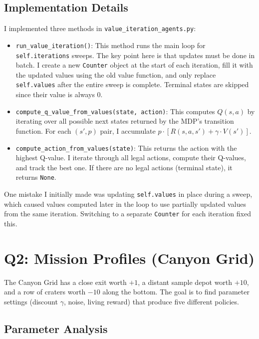 \documentclass[11pt,a4paper]{article}
\begin{document}
\subsection{Implementation Details}

I implemented three methods in \texttt{value\_iteration\_agents.py}:

\begin{itemize}[leftmargin=2em]
    \item \texttt{run\_value\_iteration()}: This method runs the main loop for \texttt{self.iterations} sweeps. The key point here is that updates must be done in batch. I create a new \texttt{Counter} object at the start of each iteration, fill it with the updated values using the old value function, and only replace \texttt{self.values} after the entire sweep is complete. Terminal states are skipped since their value is always 0.

    \item \texttt{compute\_q\_value\_from\_values(state, action)}: This computes $Q(s,a)$ by iterating over all possible next states returned by the MDP's transition function. For each $(s', p)$ pair, I accumulate $p \cdot [R(s,a,s') + \gamma \cdot V(s')]$.

    \item \texttt{compute\_action\_from\_values(state)}: This returns the action with the highest Q-value. I iterate through all legal actions, compute their Q-values, and track the best one. If there are no legal actions (terminal state), it returns \texttt{None}.
\end{itemize}

One mistake I initially made was updating \texttt{self.values} in place during a sweep, which caused values computed later in the loop to use partially updated values from the same iteration. Switching to a separate \texttt{Counter} for each iteration fixed this.

\section{Q2: Mission Profiles (Canyon Grid)}

The Canyon Grid has a close exit worth $+1$, a distant sample depot worth $+10$, and a row of craters worth $-10$ along the bottom. The goal is to find parameter settings (discount $\gamma$, noise, living reward) that produce five different policies.

\subsection{Parameter Analysis}
\end{document}
